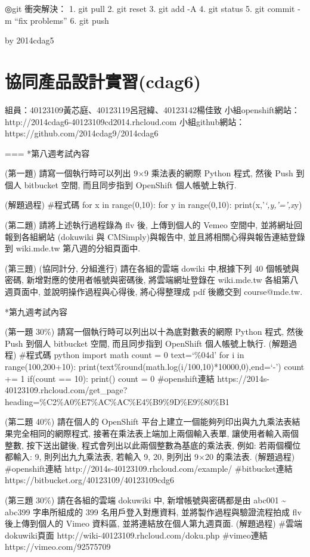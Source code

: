 \documentclass[]{article}
\begin{document}
◎git 衝突解決： 1. git pull 2. git reset 3. git add -A 4. git status 5.
git commit -m ``fix problems'' 6. git push

by 2014cdag5

\section{協同產品設計實習(cdag6)}\label{ux5354ux540cux7522ux54c1ux8a2dux8a08ux5be6ux7fd2cdag6}

組員：40123109黃芯庭、40123119呂冠緯、40123142楊佳致
小組openshift網站：http://2014cdag6-40123109cd2014.rhcloud.com
小組github網站：https://github.com/2014cdag9/2014cdag6

=== *第八週考試內容

(第一題) 請寫一個執行時可以列出 9×9 乘法表的網際 Python 程式, 然後 Push
到個人 bitbucket 空間, 而且同步指到 OpenShift 個人帳號上執行.

(解題過程) \#程式碼 for x in range(0,10): for y in range(0,10):
print(x,'\emph{`,y,'=',x}y)

(第二題) 請將上述執行過程錄為 flv 後, 上傳到個人的 Vemeo 空間中,
並將網址回報到各組網站 (dokuwiki 與 CMSimply)與報告中,
並且將相關心得與報告連結登錄到 wiki.mde.tw 第八週的分組頁面中.

(第三題) (協同計分, 分組進行) 請在各組的雲端 dowiki 中,根據下列 40
個帳號與密碼, 新增對應的使用者帳號與密碼後, 將雲端網址登錄在 wiki.mde.tw
各組第八週頁面中, 並說明操作過程與心得後, 將心得整理成 pdf 後繳交到
course@mde.tw.

*第九週考試內容

(第一題 30\%) 請寫一個執行時可以列出以十為底對數表的網際 Python 程式,
然後 Push 到個人 bitbucket 空間, 而且同步指到 OpenShift 個人帳號上執行.
(解題過程) \#程式碼 python import math count = 0 text=`\%04d' for i in
range(100,200+10):
print(text\%round(math.log(i/100,10)*10000,0),end=`-') count += 1
if(count == 10): print() count = 0 \#openshift連結
https://2014s-40123109.rhcloud.com/get\_page?heading=\%C2\%A0\%E7\%AC\%AC\%E4\%B9\%9D\%E9\%80\%B1

(第二題 40\%) 請在個人的 OpenShift
平台上建立一個能夠列印出與九九乘法表結果完全相同的網際程式,
接著在乘法表上端加上兩個輸入表單, 讓使用者輸入兩個整數, 按下送出鍵後,
程式會列出以此兩個整數為基底的乘法表, 例如: 若兩個欄位都輸入: 9,
則列出九九乘法表, 若輸入 9, 20, 則列出 9×20 的乘法表. (解題過程)
\#openshift連結 http://2014s-40123109.rhcloud.com/example/
\#bitbucket連結 https://bitbucket.org/40123109/40123109cdg6

(第三題 30\%) 請在各組的雲端 dokuwiki 中, 新增帳號與密碼都是由 abc001
\textasciitilde{} abc399 字串所組成的 399 名用戶登入對應資料,
並將製作過程與驗證流程拍成 flv 後上傳到個人的 Vimeo 資料區,
並將連結放在個人第九週頁面. (解題過程) \#雲端dokuwiki頁面
http://wiki-40123109.rhcloud.com/doku.php \#vimeo連結
https://vimeo.com/92575709
\end{document}

